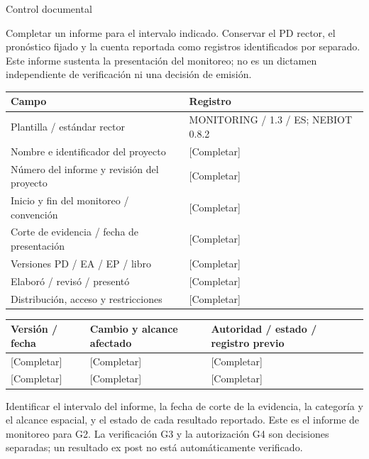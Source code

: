\clearpage
{\fontsize{23}{27}\selectfont\color{NEBGreen}Control documental\par}
\begin{Notice}Completar un informe para el intervalo indicado. Conservar el PD rector, el pronóstico fijado y la cuenta reportada como registros identificados por separado. Este informe sustenta la presentación del monitoreo; no es un dictamen independiente de verificación ni una decisión de emisión.\end{Notice}
{\sffamily\fontsize{8.6}{10.7}\selectfont\begin{longtable}{@{}P{82mm}P{82mm}@{}}
\toprule
\textbf{Campo} & \textbf{Registro}\\\midrule\endhead
\rule{0pt}{8mm}Plantilla / estándar rector & MONITORING / 1.3 / ES; NEBIOT 0.8.2\\\hline
\rule{0pt}{8mm}Nombre e identificador del proyecto & [Completar]\\\hline
\rule{0pt}{8mm}Número del informe y revisión del proyecto & [Completar]\\\hline
\rule{0pt}{8mm}Inicio y fin del monitoreo / convención & [Completar]\\\hline
\rule{0pt}{8mm}Corte de evidencia / fecha de presentación & [Completar]\\\hline
\rule{0pt}{8mm}Versiones PD / EA / EP / libro & [Completar]\\\hline
\rule{0pt}{8mm}Elaboró / revisó / presentó & [Completar]\\\hline
\rule{0pt}{8mm}Distribución, acceso y restricciones & [Completar]\\\hline
\end{longtable}}
{\sffamily\fontsize{8.6}{10.7}\selectfont\begin{longtable}{@{}P{48mm}P{61mm}P{53mm}@{}}
\toprule
\textbf{Versión / fecha} & \textbf{Cambio y alcance afectado} & \textbf{Autoridad / estado / registro previo}\\\midrule\endhead
\rule{0pt}{8mm}[Completar] & [Completar] & [Completar]\\\hline
\rule{0pt}{8mm}[Completar] & [Completar] & [Completar]\\\hline
\end{longtable}}
\clearpage
\tableofcontents
{}
Identificar el intervalo del informe, la fecha de corte de la evidencia, la categoría y el alcance espacial, y el estado de cada resultado reportado. Este es el informe de monitoreo para G2. La verificación G3 y la autorización G4 son decisiones separadas; un resultado ex post no está automáticamente verificado.\par
